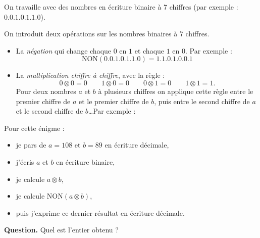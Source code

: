 \documentclass[class=report,crop=false, 12pt]{standalone}
\begin{document}


\begin{enigme}[Binaire]

On travaille avec des nombres en écriture binaire à 7 chiffres (par exemple :
$0.0.1.0.1.1.0$).

On introduit deux opérations sur les nombres binaires à 7 chiffres.
\begin{itemize}
  \item La \emph{négation} qui change chaque $0$ en $1$ et chaque $1$ en $0$.
  Par exemple :
  $$\text{NON}(0.0.1.0.1.1.0) = 1.1.0.1.0.0.1$$

\item La \emph{multiplication chiffre à chiffre}, avec la règle :
  \[
  0 \otimes 0 = 0 \qquad 1 \otimes 0 = 0 \qquad 0 \otimes 1 = 0 \qquad 1 \otimes 1 = 1.
  \]
 Pour deux nombres $a$ et $b$ à plusieurs chiffres on applique cette règle entre le premier chiffre de $a$ et le premier chiffre de $b$, puis entre le second chiffre de $a$ et le second chiffre de $b$\ldots Par exemple :
 
\end{itemize}

\bigskip

Pour cette énigme : 
\begin{itemize}
  \item je pars de $a= 108$ et $b=89$ en écriture décimale,
  \item j'écris $a$ et $b$ en écriture binaire,
  \item je calcule $a \otimes b$,
  \item je calcule $\text{NON}(a\otimes b)$,
  \item puis j'exprime ce dernier résultat en écriture décimale.
\end{itemize}
 
\bigskip

\textbf{Question.} Quel est l'entier obtenu ? %


\end{enigme}
\end{document}
